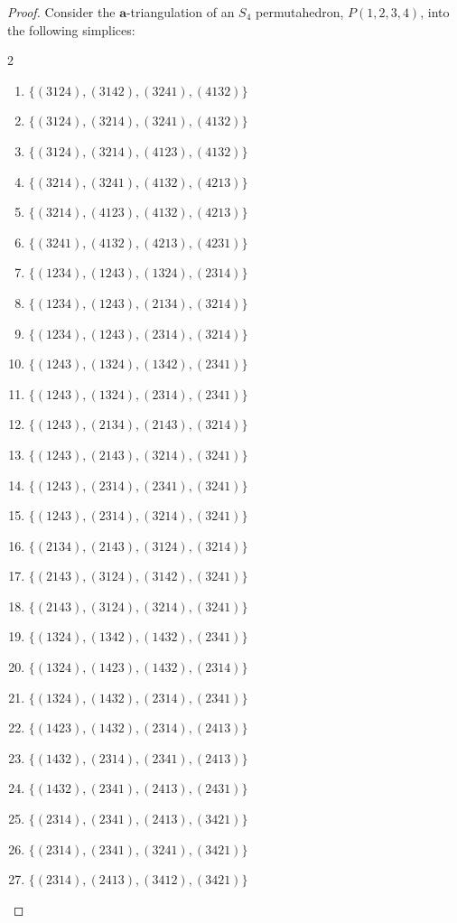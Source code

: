 \documentclass{amsart}
\theoremstyle{definition}
\def\ba{\mathbf{a}}
\begin{document}
\begin{proof} 
    Consider the $\ba$-triangulation of an $S_4$ permutahedron, $P(1,2,3,4)$, into the following simplices:
\begin{multicols}{2}
\begin{enumerate}[label=$S_{\arabic*}$, itemsep=1pt]
    \item $\{(3124), (3142), (3241), (4132)\}$
    \item $\{(3124), (3214), (3241), (4132)\}$
    \item $\{(3124), (3214), (4123), (4132)\}$
    \item $\{(3214), (3241), (4132), (4213)\}$
    \item $\{(3214), (4123), (4132), (4213)\}$
    \item $\{(3241), (4132), (4213), (4231)\}$
    \item $\{(1234), (1243), (1324), (2314)\}$
    \item $\{(1234), (1243), (2134), (3214)\}$
    \item $\{(1234), (1243), (2314), (3214)\}$
    \item $\{(1243), (1324), (1342), (2341)\}$
    \item $\{(1243), (1324), (2314), (2341)\}$
    \item $\{(1243), (2134), (2143), (3214)\}$
    \item $\{(1243), (2143), (3214), (3241)\}$
    \item $\{(1243), (2314), (2341), (3241)\}$
    \item $\{(1243), (2314), (3214), (3241)\}$
    \item $\{(2134), (2143), (3124), (3214)\}$
    \item $\{(2143), (3124), (3142), (3241)\}$
    \item $\{(2143), (3124), (3214), (3241)\}$
    \item $\{(1324), (1342), (1432), (2341)\}$
    \item $\{(1324), (1423), (1432), (2314)\}$
    \item $\{(1324), (1432), (2314), (2341)\}$
    \item $\{(1423), (1432), (2314), (2413)\}$
    \item $\{(1432), (2314), (2341), (2413)\}$
    \item $\{(1432), (2341), (2413), (2431)\}$
    \item $\{(2314), (2341), (2413), (3421)\}$
    \item $\{(2314), (2341), (3241), (3421)\}$
    \item $\{(2314), (2413), (3412), (3421)\}$

\end{enumerate}
\end{multicols}
\end{proof}
\end{document}

